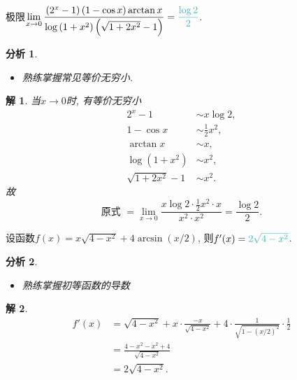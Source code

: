 \documentclass[a4paper, 12pt]{ctexart}
\theoremstyle{plain}
\theoremstyle{nonumberplain}
\newtheorem{solution}{解}
\theoremstyle{nonumberplain}
\newtheorem{analysis}{分析}
\theoremstyle{nonumberplain}
\newcommand{\ans}[1]{\textcolor{Aquamarine}{#1}}
\begin{document}
    \begin{problem}
        极限$\displaystyle \lim_{x\to 0}\frac{\left(2^x-1\right)(1-\cos x)\arctan x}{\log\left(1+x^2\right)\left(\sqrt{1+2x^2}-1\right)}=\ans{\frac{\log 2}{2}}$.
    \end{problem}
    \begin{analysis}
        \begin{itemize}
            \item 熟练掌握常见等价无穷小.
        \end{itemize}
    \end{analysis}
    \begin{solution}
        当$x\to 0$时, 有等价无穷小
        \begin{equation}
            \begin{aligned}
                2^x-1&\sim x\log 2,\\
                1-\cos x&\sim \frac{1}{2}x^2,\\
                \arctan x&\sim x,\\
                \log(1+x^2)&\sim x^2,\\
                \sqrt{1+2x^2}-1&\sim x^2.
            \end{aligned}
        \end{equation}
        故
        \begin{equation}
            \text{原式 }=\lim_{x\to 0}\frac{x\log 2\cdot \frac{1}{2}x^2\cdot x}{x^2\cdot x^2}=\frac{\log 2}{2}.
        \end{equation}
    \end{solution}

    \begin{problem}
        设函数$f(x)=x\sqrt{4-x^2}+4\arcsin (x/2)$, 则$f'(x)=\ans{2\sqrt{4-x^2}}$.
    \end{problem}
    \begin{analysis}
        \begin{itemize}
            \item 熟练掌握初等函数的导数
        \end{itemize}
    \end{analysis}
    \begin{solution}
        \begin{equation}
            \begin{aligned}
                f'(x)
                &= \sqrt{4-x^2}+x\cdot\frac{-x}{\sqrt{4-x^2}}+4\cdot\frac{1}{\sqrt{1-(x/2)^2}}\cdot \frac{1}{2}\\
                &= \frac{4-x^2-x^2+4}{\sqrt{4-x^2}}\\
                &= 2\sqrt{4-x^2}.
            \end{aligned}
        \end{equation}
    \end{solution}
\end{document}
